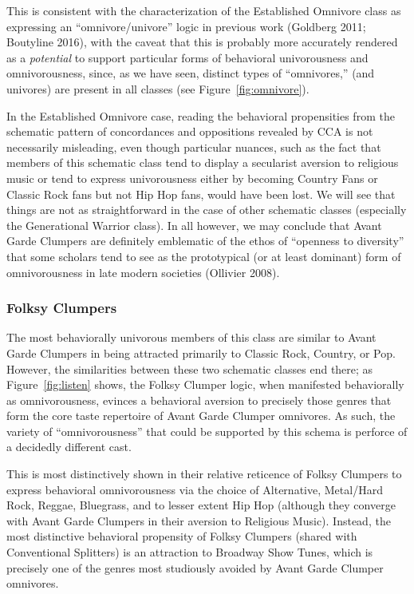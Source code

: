\documentclass[preprint,12pt]{elsarticle}
\begin{document}
This is consistent with the characterization of the Established Omnivore class as expressing an ``omnivore/univore'' logic in previous work (Goldberg 2011;  Boutyline 2016), with the caveat that this is probably more accurately rendered as a \emph{potential} to support particular forms of behavioral univorousness and omnivorousness, since, as we have seen, distinct types of ``omnivores,'' (and univores) are present in all classes (see Figure~\ref{fig:omnivore}). 

In the Established Omnivore case, reading the behavioral propensities from the schematic pattern of concordances and oppositions revealed by CCA is not necessarily misleading, even though particular nuances, such as the fact that members of this schematic class tend to display a secularist aversion to religious music or tend to express univorousness either by becoming Country Fans or Classic Rock fans but not Hip Hop fans, would have been lost. We will see that things are not as straightforward in the case of other schematic classes (especially the Generational Warrior class). In all however, we may conclude that Avant Garde Clumpers are definitely emblematic of the ethos of ``openness to diversity'' that some scholars tend to see as the prototypical (or at least dominant) form of omnivorousness in late modern societies (Ollivier 2008).

\subsubsection{Folksy Clumpers}
The most behaviorally univorous members of this class are similar to Avant Garde Clumpers in being attracted primarily to Classic Rock, Country, or Pop. However, the similarities between these two schematic classes end there; as Figure~\ref{fig:listen} shows, the Folksy Clumper logic, when manifested behaviorally as omnivorousness, evinces a behavioral aversion to precisely those genres that form the core taste repertoire of Avant Garde Clumper omnivores. As such, the variety of ``omnivorousness'' that could be supported by this schema is perforce of a decidedly different cast. 

This is most distinctively shown in their relative reticence of Folksy Clumpers to express behavioral omnivorousness via the choice of Alternative, Metal/Hard Rock, Reggae, Bluegrass, and to lesser extent Hip Hop (although they converge with Avant Garde Clumpers in their aversion to Religious Music). Instead, the most distinctive behavioral propensity of Folksy Clumpers (shared with Conventional Splitters) is an attraction to Broadway Show Tunes, which is precisely one of the genres most studiously avoided by Avant Garde Clumper omnivores. 
\end{document}
